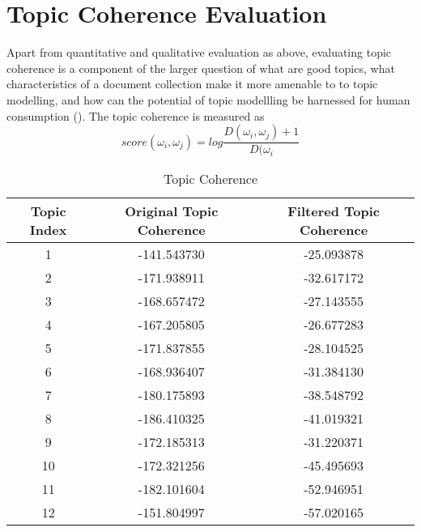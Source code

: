 \documentclass[11pt,twoside]{report}
\begin{document}
\section{Topic Coherence Evaluation}
Apart from quantitative and qualitative evaluation as above, evaluating topic coherence is a component of the larger question of what are good topics, what characteristics of a document collection make it more amenable to to topic modelling, and how can the potential of topic modellling be harnessed for human consumption (\cite{ref27}). The topic coherence is measured as
\begin{equation}
score(\omega_i, \omega_j) = log\frac{D(\omega_i, \omega_j) + 1}{D(\omega_i}
\end{equation}
\begin{table}[ht]
\caption{Topic Coherence}
\centering
\begin{tabular}{c c c}
\hline\hline
Topic Index & Original Topic Coherence & Filtered Topic Coherence\\
\hline
1 & -141.543730 & -25.093878\\
2 & -171.938911 & -32.617172\\
3 & -168.657472 & -27.143555\\
4 & -167.205805 & -26.677283\\
5 & -171.837855 & -28.104525\\
6 & -168.936407 & -31.384130\\
7 & -180.175893 & -38.548792\\
8 & -186.410325 & -41.019321\\
9 & -172.185313 & -31.220371\\
10 & -172.321256 & -45.495693\\
11 & -182.101604 & -52.946951\\
12 & -151.804997 & -57.020165\\
\hline
\end{tabular}
\label{table:Topic Coherence}
\end{table}
\end{document}
